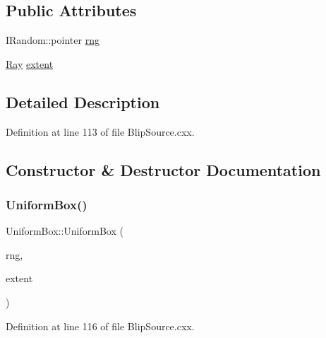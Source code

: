 \subsection*{Public Attributes}
\begin{DoxyCompactItemize}
\item 
I\+Random\+::pointer \hyperlink{struct_uniform_box_a462f51835c09f3609f2912ecbe943659}{rng}
\item 
\hyperlink{namespace_wire_cell_a3ab20d9b438feb7eb1ffaab9ba98af0c}{Ray} \hyperlink{struct_uniform_box_a9fb28af5ad857b4b381059fc77ab79c9}{extent}
\end{DoxyCompactItemize}


\subsection{Detailed Description}


Definition at line 113 of file Blip\+Source.\+cxx.



\subsection{Constructor \& Destructor Documentation}
\mbox{\label{struct_uniform_box_a51defb5a1c6128d3442f9b019aa11865}} 
\subsubsection{\texorpdfstring{Uniform\+Box()}{UniformBox()}}
{\footnotesize\ttfamily Uniform\+Box\+::\+Uniform\+Box (\begin{DoxyParamCaption}\item[{I\+Random\+::pointer}]{rng,  }\item[{const \hyperlink{namespace_wire_cell_a3ab20d9b438feb7eb1ffaab9ba98af0c}{Ray} \&}]{extent }\end{DoxyParamCaption})\hspace{0.3cm}{\ttfamily [inline]}}



Definition at line 116 of file Blip\+Source.\+cxx.

\mbox{\label{struct_uniform_box_a54e730b3de5f83e9f840e2c96b4abaf8}} 
